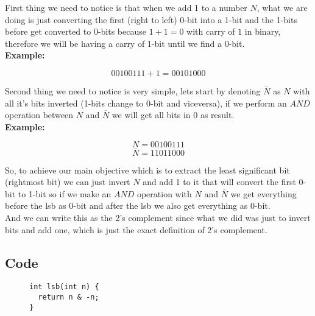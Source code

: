 \vspace{1em}
\sffamily
\bgroup

First thing we need to notice is that when we add 1 to a number $N$, what we are doing is just converting the first (right to left) 0-bit into a 1-bit and
the 1-bits before get converted to 0-bits because $1 + 1 = 0$ with carry of $1$ in binary, therefore we will be having a carry of 1-bit until we find a 0-bit.\\

\textbf{Example:}

$$00100111 + 1 = 00101000$$

Second thing we need to notice is very simple, lets start by denoting $\overline{N}$ as $N$ with all it's bits inverted (1-bits change to 0-bit and viceversa), if we perform an $AND$ operation between $N$ and $\overline{N}$ we will get all bits in $0$ as result.\\

\textbf{Example:}

$$N = 00100111$$
$$\overline{N} = 11011000$$

So, to achieve our main objective which is to extract the least significant bit (rightmost bit) we can just invert $N$ and add 1 to it that will convert the first 0-bit to 1-bit so if we make an $AND$ operation with $N$ and $\overline{N}$ we get everything before the lsb as 0-bit and after the lsb we also get everything as 0-bit.\\

And we can write this as the 2's complement since what we did was just to invert bits and add one, which is just the exact definition of 2's complement.\\

\subsection*{Code}

\begin{figure}[thp]
  \centering
  \begin{minipage}[c]{0.9\textwidth}
    \begin{verbatim}
int lsb(int n) {
  return n & -n;
}
      \end{verbatim}
  \end{minipage}
\end{figure}

\egroup
\vspace{1em}